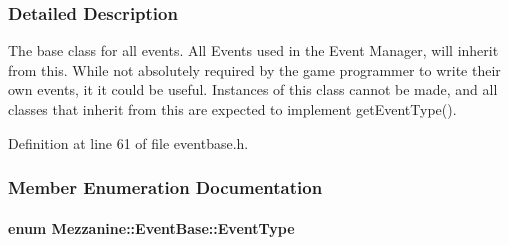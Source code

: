 \subsubsection{Detailed Description}
The base class for all events. All Events used in the Event Manager, will inherit from this. While not absolutely required by the game programmer to write their own events, it it could be useful. Instances of this class cannot be made, and all classes that inherit from this are expected to implement getEventType(). 

Definition at line 61 of file eventbase.h.



\subsubsection{Member Enumeration Documentation}
\hypertarget{classMezzanine_1_1EventBase_ab85e31e97753b7e7ecb098f82526baef}{
\paragraph[{EventType}]{\setlength{\rightskip}{0pt plus 5cm}enum {\bf Mezzanine::EventBase::EventType}}\hfill}
\label{classMezzanine_1_1EventBase_ab85e31e97753b7e7ecb098f82526baef}
